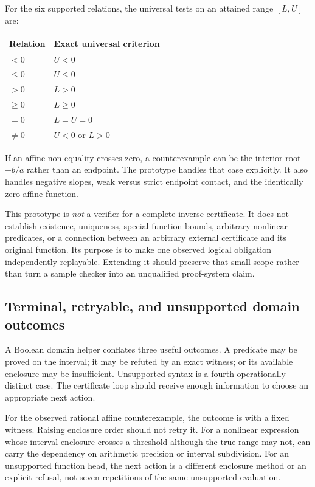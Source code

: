 \documentclass[11pt,a4paper]{article}
\newcommand{\code}[1]{\texttt{\detokenize{#1}}}
\begin{document}
For the six supported relations, the universal tests on an attained range $[L,U]$ are:
\begin{center}
\begin{tabular}{@{}ll@{}}\toprule
Relation & Exact universal criterion\\\midrule
$<0$ & $U<0$\\
$\leq0$ & $U\leq0$\\
$>0$ & $L>0$\\
$\geq0$ & $L\geq0$\\
$=0$ & $L=U=0$\\
$\ne0$ & $U<0$ or $L>0$\\
\bottomrule\end{tabular}
\end{center}
If an affine non-equality crosses zero, a counterexample can be the interior root $-b/a$ rather than an endpoint. The prototype handles that case explicitly. It also handles negative slopes, weak versus strict endpoint contact, and the identically zero affine function.

This prototype is \emph{not} a verifier for a complete inverse certificate. It does not establish existence, uniqueness, special-function bounds, arbitrary nonlinear predicates, or a connection between an arbitrary external certificate and its original function. Its purpose is to make one observed logical obligation independently replayable. Extending it should preserve that small scope rather than turn a sample checker into an unqualified proof-system claim.

\subsection{Terminal, retryable, and unsupported domain outcomes}
A Boolean domain helper conflates three useful outcomes. A predicate may be proved on the interval; it may be refuted by an exact witness; or its available enclosure may be insufficient. Unsupported syntax is a fourth operationally distinct case. The certificate loop should receive enough information to choose an appropriate next action.

For the observed rational affine counterexample, the outcome is \code{Disproved} with a fixed witness. Raising enclosure order should not retry it. For a nonlinear expression whose interval enclosure crosses a threshold although the true range may not, \code{Unresolved} can carry the dependency on arithmetic precision or interval subdivision. For an unsupported function head, the next action is a different enclosure method or an explicit refusal, not seven repetitions of the same unsupported evaluation.
\end{document}
